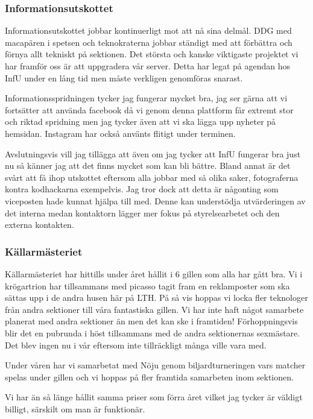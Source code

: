 \documentclass[../_main/handlingar.tex]{subfiles}
\begin{document}
\subsubsection*{Informationsutskottet}
Informationsutskottet jobbar kontinuerligt mot att nå sina delmål. DDG med macapären i spetsen och teknokraterna jobbar ständigt med att förbättra och förnya allt tekniskt på sektionen. Det största och kanske viktigaste projektet vi har framför oss är att uppgradera vår server. Detta har legat på agendan hos InfU under en lång tid men måste verkligen genomföras snarast. 

Informationsspridningen tycker jag fungerar mycket bra, jag ser gärna att vi fortsätter att använda facebook då vi genom denna plattform får extremt stor och riktad spridning men jag tycker även att vi ska lägga upp nyheter på hemsidan. Instagram har också använts flitigt under terminen. 

Avslutningsvis vill jag tillägga att även om jag tycker att InfU fungerar bra just nu så känner jag att det finns mycket som kan bli bättre. Bland annat är det svårt att få ihop utskottet eftersom alla jobbar med så olika saker, fotograferna kontra kodhackarna exempelvis. Jag tror dock att detta är någonting som viceposten hade kunnat hjälpa till med. Denne kan understödja utvärderingen av det interna medan kontaktorn lägger mer fokus på styrelsearbetet och den externa kontakten. 

\subsubsection*{Källarmästeriet}
Källarmästeriet har hittills under året hållit i 6 gillen som alla har gått bra. Vi i krögartrion har tillsammans med picasso tagit fram en reklamposter som ska sättas upp i de andra husen här på LTH. På så vis hoppas vi locka fler teknologer från andra sektioner till våra fantastiska gillen.
Vi har inte haft något samarbete planerat med andra sektioner än men det kan ske i framtiden! Förhoppningsvis blir det en pubrunda i höst tillsammans med de andra sektionernas sexmästare. Det blev ingen nu i vår eftersom inte tillräckligt många ville vara med. 

Under våren har vi samarbetat med Nöju genom biljardturneringen vars matcher spelas under gillen och vi hoppas på fler framtida samarbeten inom sektionen.
 
Vi har än så länge hållit samma priser som förra året vilket jag tycker är väldigt billigt, särskilt om man är funktionär.
 
\end{document}
